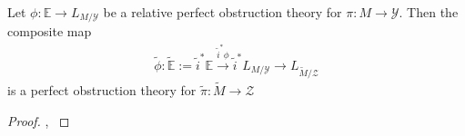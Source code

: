 \begin{lem}\label{rl-0017}\label{lem:obstruction-theory-for-tilde-M}
  Let \(\phi:\mathbb E\to L_{M/\mathcal Y}\) be a relative perfect obstruction theory for \(\pi:M\to \mathcal Y\). Then the composite map
  \begin{align*}
    \widetilde \phi:\widetilde{\mathbb E} := \tilde i^*\mathbb E \xrightarrow{\tilde i^*\phi} \widetilde i^*L_{M/\mathcal Y} \to L_{\widetilde M/\mathcal Z}
  \end{align*}
  is a perfect obstruction theory for \(\tilde \pi:\widetilde M\to \mathcal Z\)
\end{lem}
\begin{proof}
  \cite[Prop. 7.2]{behrend-fantechi_IntrinsicNormalCone1997}, \cite[Theorem 4.3]{manolache_VirtualPullbacks2012}

\end{proof}
